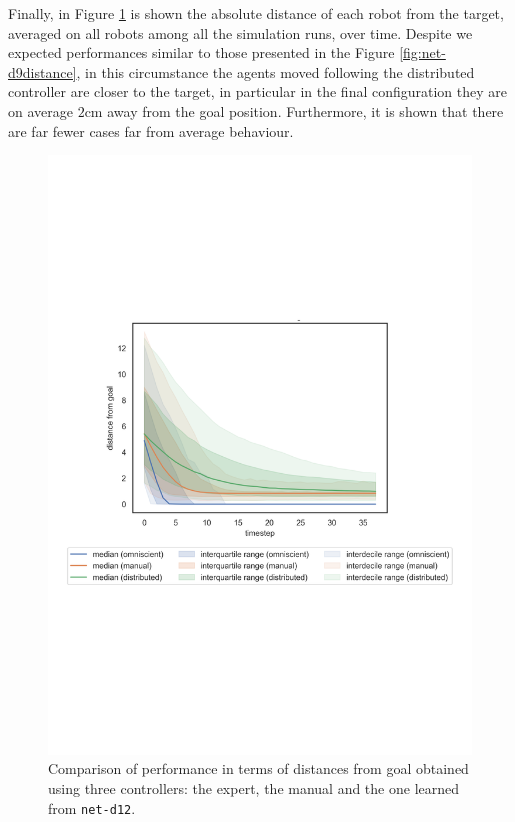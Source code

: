 Finally, in Figure \ref{fig:net-d12distance} is shown the absolute distance of 
each robot from the target, averaged on all robots among all the simulation runs, 
over time. 
Despite we expected performances similar to those presented in the Figure 
\ref{fig:net-d9distance}, in this circumstance the agents moved following the 
distributed controller are closer to the target, in particular in the final 
configuration they are on average $2$\gls{cm} away from the goal position. 
Furthermore, it is shown that there are far fewer cases far from average 
behaviour.
\begin{figure}[!htb]
	\centering
	\includegraphics[width=.65\textwidth]{contents/images/net-d12/distances-from-goal-compressed-distributed}%
	\caption[Evaluation of \texttt{net-d1} distances from goal.]{Comparison of 
		performance in terms of distances from goal obtained using three 
		controllers: 
		the expert, the manual and the one learned from \texttt{net-d12}.}
	\label{fig:net-d12distance}
\end{figure}


